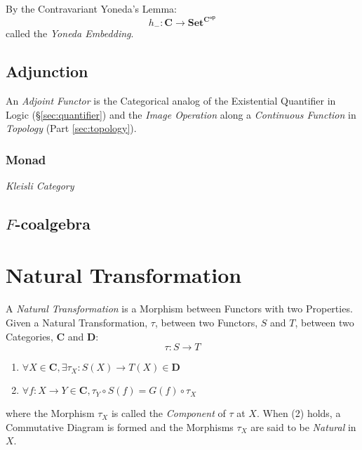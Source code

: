 By the Contravariant Yoneda's Lemma:
\[
    h_-: \mathbf{C} \rightarrow \mathbf{Set^{C^{op}}}
\]
called the \emph{Yoneda Embedding}.



\subsection{Adjunction}\label{sec:adjunction}

An \emph{Adjoint Functor} is the Categorical analog of the Existential
Quantifier in Logic (\S\ref{sec:quantifier}) and the \emph{Image
  Operation} along a \emph{Continuous Function} in \emph{Topology}
(Part \ref{sec:topology}).



\subsubsection{Monad}\label{sec:monad}

\emph{Kleisli Category}



\subsection{$F$-coalgebra}\label{sec:f_coalgebra}



\section{Natural Transformation}\label{sec:natural_transformation}

A \emph{Natural Transformation} is a Morphism between Functors with
two Properties. Given a Natural Transformation, $\tau$, between two
Functors, $S$ and $T$, between two Categories, $\mathbf{C}$ and
$\mathbf{D}$:
\[
    \tau : S \rightarrow T
\]
\begin{enumerate}
    \item $\forall X \in \mathbf{C},
        \exists \tau_X : S(X) \rightarrow T(X) \in \mathbf{D}$
    \item $\forall f : X \rightarrow Y \in \mathbf{C},
        \tau_Y \circ S(f) = G(f) \circ \tau_X$
\end{enumerate}
where the Morphism $\tau_X$ is called the \emph{Component} of $\tau$
at $X$. When (2) holds, a Commutative Diagram is formed and the
Morphisms $\tau_X$ are said to be \emph{Natural} in $X$.

